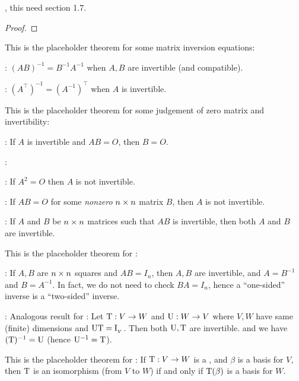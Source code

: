 \begin{exercise} \label{exercise 2.4.25}
\TODOREF{} , this need section 1.7.
\end{exercise}

\begin{proof}
\end{proof}

\begin{additional theorem} \label{athm 2.36}
This is the placeholder theorem for some matrix inversion equations:

 : \((AB)^{-1} = B^{-1} A^{-1}\) when \(A, B\) are invertible (and compatible).

 : \((A^\top)^{-1} = (A^{-1})^\top\) when \(A\) is invertible.
\end{additional theorem}

\begin{additional theorem} \label{athm 2.37}
This is the placeholder theorem for some judgement of zero matrix and invertibility:

 : If \(A\) is invertible and \(AB = O\), then \(B = O\).

:

: If \(A^2 = O\) then \(A\) is not invertible.

: If \(AB = O\) for some \emph{nonzero} \(n \times n\) matrix \(B\), then \(A\) is not invertible.

 : If \(A\) and \(B\) be \(n \times n\) matrices such that \(AB\) is invertible, then both \(A\) and \(B\) are invertible.
\end{additional theorem}

\begin{additional theorem} \label{athm 2.38}
This is the placeholder theorem for :

: If \(A, B\) are \(n \times n\) squares and \(AB = I_n\), then \(A, B\) are invertible, and \(A = B^{-1}\) and \(B = A^{-1}\).
In fact, we do not need to check \(BA = I_n\), hence a ``one-sided'' inverse is a ``two-sided'' inverse.

: Analogous result for \LTRAN{}:
Let \(\mathrm{T} : V \to W\) and \(\mathrm{U} : W \to V\) where \(V, W\) have same (finite) dimensions and \(\mathrm{U}\mathrm{T} = \mathrm{I}_{_V}\).
Then both \(\mathrm{U}, \mathrm{T}\) are invertible. and we have \((\mathrm{T})^{-1} = \mathrm{U}\) (hence \(\mathrm{U}^{-1} = \mathrm{T}\)).
\end{additional theorem}

\begin{additional theorem} \label{athm 2.39}
This is the placeholder theorem for :
If \(\mathrm{T} : V \to W\) is a \LTRAN{}, and \(\beta\) is a basis for \(V\), then \(\mathrm{T}\) is an isomorphism (from \(V\) to \(W\)) if and only if \(\mathrm{T}(\beta)\) is a basis for \(W\).
\end{additional theorem}

